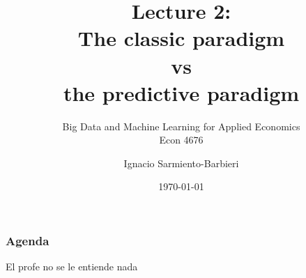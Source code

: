 \documentclass[
  shownotes,
  xcolor={svgnames},
  hyperref={colorlinks,citecolor=DarkBlue,linkcolor=DarkRed,urlcolor=DarkBlue}
  ]{beamer}
\begin{document}
\title[Lecture 2]{Lecture 2: \\ The classic paradigm \\ vs \\ the predictive paradigm}
\subtitle{Big Data and Machine Learning for Applied Economics \\ Econ 4676}
\date{\today}

\author[Sarmiento-Barbieri]{Ignacio Sarmiento-Barbieri}


\begin{frame}[noframenumbering]
\maketitle
\end{frame}





\begin{frame}
\frametitle{Agenda}

\tableofcontents

El profe no se le entiende nada

\end{frame}



\end{document}
